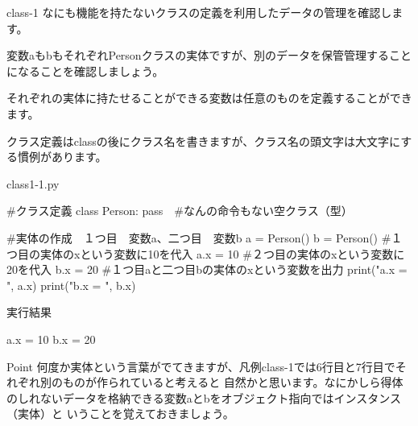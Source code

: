 \begin{pabox}{class-1}
なにも機能を持たないクラスの定義を利用したデータの管理を確認します。

変数aもbもそれぞれPersonクラスの実体ですが、別のデータを保管管理することになることを確認しましょう。

それぞれの実体に持たせることができる変数は任意のものを定義することができます。


クラス定義はclassの後にクラス名を書きますが、クラス名の頭文字は大文字にする慣例があります。
\begin{legbox}{class1-1.py}
\begin{listing}{1}
#クラス定義
class Person:
    pass　#なんの命令もない空クラス（型）
    
#実体の作成　１つ目　変数a、二つ目　変数b
a = Person()
b = Person()
#１つ目の実体のxという変数に10を代入
a.x = 10
#２つ目の実体のxという変数に20を代入
b.x = 20
#１つ目aと二つ目bの実体のxという変数を出力 
print("a.x = ", a.x)
print("b.x = ", b.x)
\end{listing}
実行結果
\begin{listing}{1}
a.x =  10
b.x =  20
\end{listing}
\end{legbox}
\end{pabox}
\begin{hipoint}{Point}
何度か実体という言葉がでてきますが、凡例class-1では6行目と7行目でそれぞれ別のものが作られていると考えると
自然かと思います。なにかしら得体のしれないデータを格納できる変数aとbをオブジェクト指向ではインスタンス（実体）と
いうことを覚えておきましょう。
\end{hipoint}
\newpage
